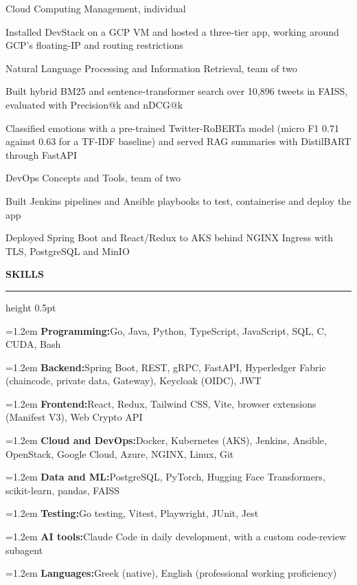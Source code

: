 \documentclass[english]{kpcv}
\renewcommand*{\cvsection}[1]{%
  \par\addvspace{10pt}%
  {\fontsize{10.2}{12}\selectfont\bfseries\color{kpaccent}%
    \addfontfeatures{LetterSpace=5}#1\par}%
  \nopagebreak\nointerlineskip\vspace{2.5pt}%
  {\color{kprule}\hrule height 0.5pt}%
  \nopagebreak\nointerlineskip\vspace{5pt}}
\let\kpcventry\cventry
\renewcommand*{\cventry}{\par\addvspace{7pt}\kpcventry}
\renewcommand*{\cvskill}[2]{%
  \par\noindent\hangindent=1.2em\hangafter=1
  {\bfseries #1:}\enspace#2\par\addvspace{1.2pt}}
\begin{document}
  {Cloud Computing Management, individual}{}
\begin{cvitems}
  \item Installed DevStack on a GCP VM and hosted a three-tier app, working around GCP's
        floating-IP and routing restrictions
\end{cvitems}

  {Natural Language Processing and Information Retrieval, team of two}{}
\begin{cvitems}
  \item Built hybrid BM25 and sentence-transformer search over 10,896 tweets in FAISS, evaluated with
        Precision@k and nDCG@k
  \item Classified emotions with a pre-trained Twitter-RoBERTa model (micro F1 0.71 against 0.63 for
        a TF-IDF baseline) and served RAG summaries with DistilBART through FastAPI
\end{cvitems}

  {DevOps Concepts and Tools, team of two}{}
\begin{cvitems}
  \item Built Jenkins pipelines and Ansible playbooks to test, containerise and deploy the app
  \item Deployed Spring Boot and React/Redux to AKS behind NGINX Ingress with TLS, PostgreSQL
        and MinIO
\end{cvitems}

\cvsection{SKILLS}
\cvskill{Programming}{Go, Java, Python, TypeScript, JavaScript, SQL, C, CUDA, Bash}
\cvskill{Backend}{Spring Boot, REST, gRPC, FastAPI, Hyperledger Fabric (chaincode, private data,
  Gateway), Keycloak (OIDC), JWT}
\cvskill{Frontend}{React, Redux, Tailwind CSS, Vite, browser extensions (Manifest V3), Web Crypto API}
\cvskill{Cloud and DevOps}{Docker, Kubernetes (AKS), Jenkins, Ansible, OpenStack, Google Cloud, Azure,
  NGINX, Linux, Git}
\cvskill{Data and ML}{PostgreSQL, PyTorch, Hugging Face Transformers, scikit-learn, pandas, FAISS}
\cvskill{Testing}{Go testing, Vitest, Playwright, JUnit, Jest}
\cvskill{AI tools}{Claude Code in daily development, with a custom code-review subagent}
\cvskill{Languages}{Greek (native), English (professional working proficiency)}
\end{document}

